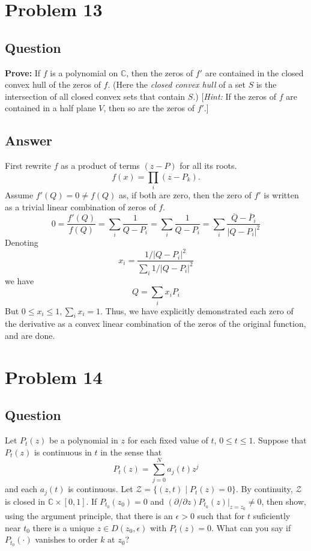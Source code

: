 \documentclass[11pt]{article}
\begin{document}
\section{Problem 13}
\subsection{Question}
{\bf Prove: } If $f$ is a polynomial on $\mathbb{C}$, then the zeros of $f'$ are contained in the closed convex hull of the zeros of $f$. (Here the \emph{closed convex hull} of a set $S$ is the intersection of all closed convex sets that contain $S$.) [\emph{Hint:} If the zeros of $f$ are contained in a half plane $V$, then so are the zeros of $f'$.]
\subsection{Answer}
First rewrite $f$ as a product of terms $(z-P)$ for all its roots.
\[f(x) = \prod_i (z - P_k).\]
Assume $f'(Q) =0 \neq f(Q)$ as, if both are zero, then  the zero of $f'$ is written as a trivial linear combination of zeros of $f$.
\[0 = \frac{f'(Q)}{f(Q)} = \sum _i \frac{1}{Q - P_i} = \sum_i \frac {1}{Q - P_i} = \sum_i \frac{\overline{Q}  - \overline{P}_i}{|Q - P_i|^2}\]
Denoting 
\[x_i = \frac{1/|Q - P_i | ^2 }{\sum_i 1/ |Q - P_i|^2}\]
we have
\[Q = \sum_i x_i P_i\]
But $0 \leq x_i \leq 1, \sum_i x_i =1$. Thus, we have explicitly demonstrated each zero of the derivative as a convex linear combination of the zeros of the original function, and are done. 


\section{Problem 14}
\subsection{Question}
Let $P_t(z)$ be a polynomial in $z$ for each fixed value of $t$, $0 \leq t \leq 1$. Suppose that $P_t(z)$ is continuous in $t$ in the sense that
\[P_t (z) = \sum_{j=0}^N a_j(t) z^j\]
and each $a_j(t) $ is continuous. Let $\mathcal{Z} = \{ (z,t) \mid P_t(z) = 0\}$. By continuity, $\mathcal{Z}$ is closed in $\mathbb{C} \times [0,1]$. If $P_{t_0}(z_0) =0$ and $(\partial / \partial z)P_{t_0}(z) |_{z= z_0} \neq 0$, then show, using the argument principle, that there is an $\epsilon > 0$ such that for $t$ suficiently near $t_0$ there is a unique $z \in D(z_0, \epsilon)$ with $P_t(z) =0$. What can you say if $P_{t_0} ( \cdot )$ vanishes to order $k$ at $z_0$?
\end{document}
